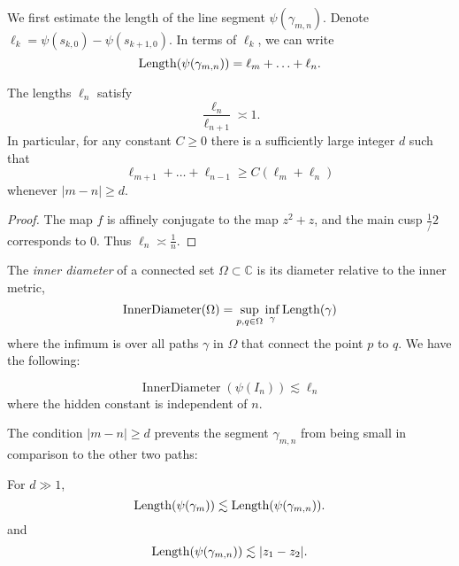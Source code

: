 We first estimate the length of the line segment $\psi(\gamma _{m,n})$. Denote 
$\ell_k = \psi(s_{k,0})-\psi(s_{k+1,0}).$
In terms of $\ell _k$, we can write
\begin{equation*}
	\operatorname{Length}(\psi(\gamma_{m,n})) = \ell_m+\ldots+\ell_n.
\end{equation*}

\begin{lemma} The lengths ${\ell_n}$ satisfy
	\begin{equation}
		\frac{\ell_n}{\ell_{n+1}} \asymp 1.
	\end{equation}
	In particular, for any constant $C \geq 0$ there is a sufficiently large integer $d$ such that
	\begin{equation*}
		\ell_{m+1}+\ldots+\ell_{n-1} \geq C (\ell_m+\ell_n)
	\end{equation*}
	whenever $|m-n| \geq d$.
\end{lemma}
\begin{proof}
	The map $f$ is affinely conjugate to the map $z^2+z$, and the main cusp $\frac 1/2$ corresponds to $0$. Thus $\ell_n \asymp \frac 1n$.
\end{proof}

The \emph{inner diameter} of a connected set $\Omega \subset \mathbb C$ is its diameter relative to the inner metric,
\begin{equation}
	\operatorname{InnerDiameter}(\Omega)=\sup _{p,q\in \Omega} \inf_\gamma \operatorname{Length}(\gamma)
\end{equation}
where the infimum is over all paths $\gamma$ in $\Omega$ that connect the point $p$ to $q$. We have the following:

\begin{lemma}
	\begin{equation*}
		\operatorname{InnerDiameter}(\psi(I_n)) \lesssim \ell_n
	\end{equation*}
	where the hidden constant is independent of $n$.
\end{lemma}

The condition $|m-n| \geq d$ prevents the segment $\gamma _{m,n}$ from being small in comparison to the other two paths:
\begin{proposition} For $d \gg 1$, 
	\begin{equation}
		\operatorname{Length}(\psi(\gamma_m)) \lesssim \operatorname{Length}(\psi(\gamma_{m,n})).
	\end{equation}
	and
	\begin{equation}
		\operatorname{Length}(\psi(\gamma_{m,n})) \lesssim |z_1-z_2|.
	\end{equation}
\end{proposition}

